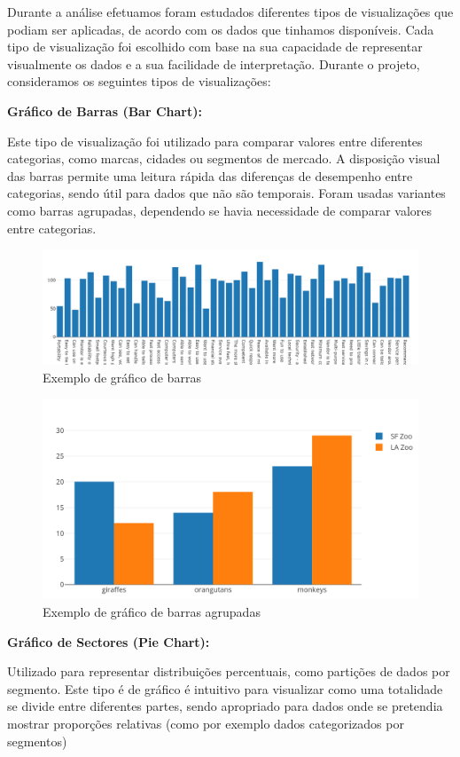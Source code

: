 Durante a análise efetuamos foram estudados diferentes tipos de visualizações que podiam ser aplicadas, de acordo com os dados que tinhamos disponíveis. Cada tipo de visualização foi escolhido com base na sua capacidade de representar visualmente os dados e a sua facilidade de interpretação. Durante o projeto, consideramos os seguintes tipos de visualizações:

\textbf{Gráfico de Barras (Bar Chart):}

Este tipo de visualização foi utilizado para comparar valores entre diferentes categorias, como marcas, cidades ou segmentos de mercado. A disposição visual das barras permite uma leitura rápida das diferenças de desempenho entre categorias, sendo útil para dados que não são temporais. Foram usadas variantes como barras agrupadas, dependendo se havia necessidade de comparar valores entre categorias.

\begin{figure}[H]
\centering
\includegraphics[max width=12cm, keepaspectratio]{./img/barras1}
\caption{Exemplo de gráfico de barras}
\end{figure}
\noindent

\begin{figure}[H]
\centering
\includegraphics[max width=12cm, keepaspectratio]{./img/agrupada}
\caption{Exemplo de gráfico de barras agrupadas}
\end{figure}
\noindent

\textbf{Gráfico de Sectores (Pie Chart):}  

Utilizado para representar distribuições percentuais, como partições de dados por segmento. Este tipo é de gráfico é intuitivo para visualizar como uma totalidade se divide entre diferentes partes, sendo apropriado para dados onde se pretendia mostrar proporções relativas (como por exemplo dados categorizados por segmentos)

